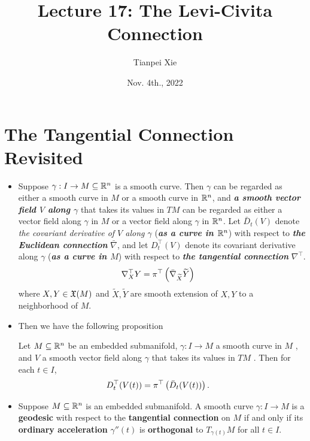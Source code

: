 \documentclass[11pt]{article}
\begin{document}
\title{Lecture 17: The Levi-Civita Connection}
\author{ Tianpei Xie}
\date{Nov. 4th., 2022}
\maketitle
\tableofcontents
\newpage
\section{The Tangential Connection Revisited}
\begin{itemize}
\item Suppose $\gamma: I \rightarrow M \subseteq {\mathbb R}^n$ is a smooth curve. Then $\gamma$ can be regarded as either a smooth curve in $M$ or a smooth curve in ${\mathbb R}^n$, and \emph{\textbf{a smooth vector field $V$ along $\gamma$}} that takes its values in $TM$ can be regarded as either a vector field along $\gamma$ in $M$ or a vector field along $\gamma$ in ${\mathbb R}^n$. Let $\bar{D}_t(V)$ denote \emph{the covariant derivative of $V$ along $\gamma$} (\emph{\textbf{as a curve in ${\mathbb R}^n$}}) with respect to \emph{\textbf{the Euclidean connection}} $\bar{\nabla}$, and let $D^{\top}_t(V)$ denote its covariant derivative along $\gamma$ (\emph{\textbf{as a curve in $M$}}) with respect to \emph{\textbf{the tangential connection}} $\nabla^{\top}$. 
\begin{align*}
\nabla^{\top}_{X}Y &= \pi^{\top}\left(\bar{\nabla}_{\widetilde{X}}\widetilde{Y}\right)
\end{align*} where $X,Y \in {\mathfrak X}(M)$ and $\widetilde{X}, \widetilde{Y}$ are smooth extension of $X, Y$ to a neighborhood of $M$. 

\item Then we have the following proposition
\begin{proposition}
Let $M \subseteq {\mathbb R}^n$ be an embedded submanifold, $\gamma: I \rightarrow M$ a smooth curve in $M$ , and $V$ a smooth vector field along  $\gamma$ that takes its values in $TM$ . Then for each $t \in I$,
\begin{align*}
D^{\top}_t(V(t)) &= \pi^{\top}\left(\bar{D}_t(V(t))\right).
\end{align*}
\end{proposition}

\item \begin{corollary}
Suppose $M \subseteq {\mathbb R}^n$ is an embedded submanifold. A smooth curve $\gamma: I \rightarrow M$  is a \textbf{geodesic} with respect to the \textbf{tangential connection} on $M$ if and only if its \textbf{ordinary acceleration} $\gamma''(t)$ is \textbf{orthogonal} to $T_{\gamma(t)}M$ for all $t \in I$.
\end{corollary}


\end{itemize}
\end{document}
